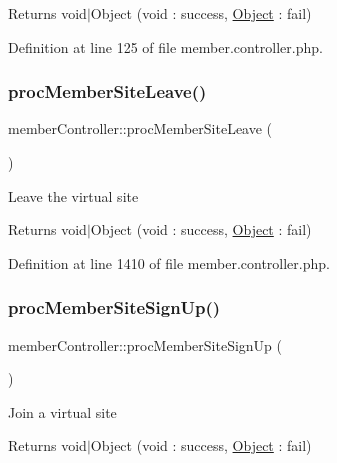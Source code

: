 \begin{DoxyReturn}{Returns}
void$\vert$\+Object (void \+: success, \hyperlink{classObject}{Object} \+: fail) 
\end{DoxyReturn}


Definition at line 125 of file member.\+controller.\+php.

\hypertarget{classmemberController_a46240bb8dbfcff52844ce8387076ca61}{}\label{classmemberController_a46240bb8dbfcff52844ce8387076ca61} 
\subsubsection{\texorpdfstring{proc\+Member\+Site\+Leave()}{procMemberSiteLeave()}}
{\footnotesize\ttfamily member\+Controller\+::proc\+Member\+Site\+Leave (\begin{DoxyParamCaption}{ }\end{DoxyParamCaption})}

Leave the virtual site

\begin{DoxyReturn}{Returns}
void$\vert$\+Object (void \+: success, \hyperlink{classObject}{Object} \+: fail) 
\end{DoxyReturn}


Definition at line 1410 of file member.\+controller.\+php.

\hypertarget{classmemberController_a4dfc326f5bc6d97b86b919c568457000}{}\label{classmemberController_a4dfc326f5bc6d97b86b919c568457000} 
\subsubsection{\texorpdfstring{proc\+Member\+Site\+Sign\+Up()}{procMemberSiteSignUp()}}
{\footnotesize\ttfamily member\+Controller\+::proc\+Member\+Site\+Sign\+Up (\begin{DoxyParamCaption}{ }\end{DoxyParamCaption})}

Join a virtual site

\begin{DoxyReturn}{Returns}
void$\vert$\+Object (void \+: success, \hyperlink{classObject}{Object} \+: fail) 
\end{DoxyReturn}


